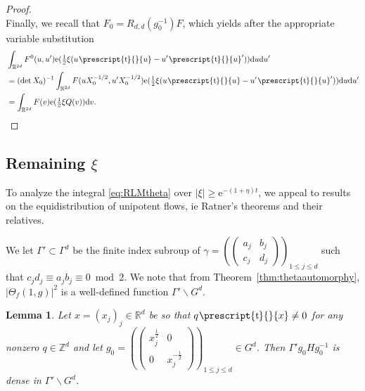 \documentclass[12pt]{amsart}
\newtheorem{lem}[thm]{Lemma}
\theoremstyle{definition}
\theoremstyle{remark}
\numberwithin{equation}{section}
\newcommand{\dd}{\mathrm{d}}
\newcommand{\R}{\mathbb{R}}
\newcommand{\Z}{\mathbb{Z}}
\newcommand{\e}{\mathrm{e}}
\newcommand*{\transp}[2][-1mu]{\ensuremath{\mskip1mu\prescript{\smash{\mathrm t\mkern#1}}{}{\mathstrut#2}}}
\begin{document}
\begin{proof}
\begin{equation}
\end{equation}
Finally, we recall that $F_0=R_{d,d}(g_0^{-1}) F$, which yields after the appropriate variable substitution
\begin{equation}
\begin{split}
 & \int_{\mathbb{R}^{2d}} F^0(u,u') \e( \tfrac{1}{2} \xi (u\transp{u}-u'\transp{u}') ) \dd u \dd u' \\
& = (\det X_0)^{-1} \int_{\mathbb{R}^{2d}} F(u X_0^{-1/2},u' X_0^{-1/2}) \e( \tfrac{1}{2} \xi (u\transp{u}-u'\transp{u}') ) \dd u \dd u' \\
& = \int_{\mathbb{R}^{2d}} F(v) \e( \tfrac{1}{2} \xi Q(v) ) \dd v.
\end{split}
\end{equation}
 
\end{proof}


\subsection{Remaining $\xi$}
\label{sec:remaining}

To analyze the integral \eqref{eq:RLMtheta} over $|\xi| \geq \e^{-(1 + \eta)t}$, we appeal to results on the equidistribution of unipotent flows, ie Ratner's theorems and their relatives.

We let $\Gamma' \subset \Gamma^d $ be the finite index subroup of $\gamma = \left(
\begin{pmatrix}
  a_j & b_j \\
  c_j & d_j
\end{pmatrix}
\right)_{\!\!1\leq j\leq d}$ such that $c_jd_j \equiv a_jb_j \equiv 0 \bmod 2$.
We note that from Theorem~\ref{thm:thetaautomorphy}, $|\Theta_f(1, g)|^2$ is a well-defined function $\Gamma' \backslash G^d$.

\begin{lem}
  \label{lem:density}
  Let $x = (x_j)_j \in \R^d$ be so that $q\transp x \neq 0$ for any nonzero $q \in \Z^d$ and let $g_0 = \left(  \begin{pmatrix}   x_j^{\frac{1}{2}} & 0 \\
    0 & x_j^{-\frac{1}{2}}
  \end{pmatrix}
  \right)_{\!\!1\leq j\leq d} \in G^d$.
  Then $\Gamma' g_0 H g_0^{-1}$ is dense in $\Gamma' \backslash G^d$.
\end{lem}
\end{document}
